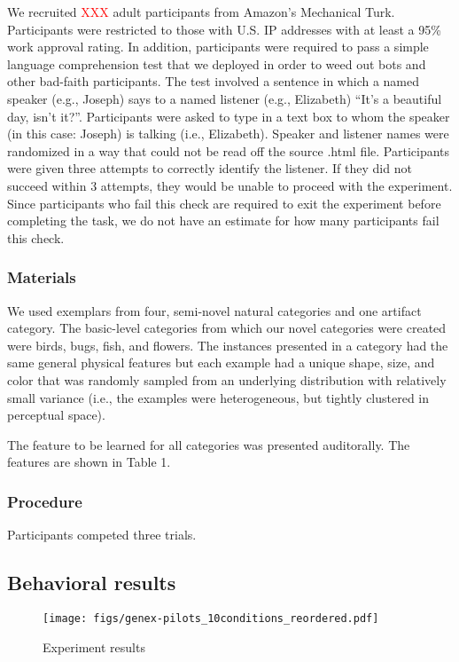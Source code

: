 \documentclass[10pt,letterpaper]{article}
\newcommand{\red}[1]{\textcolor{Red}{#1}}
\begin{document}
We recruited \red{XXX} adult participants from Amazon's Mechanical Turk. 
Participants were restricted to those with U.S. IP addresses with at least a 95\% work approval rating. 
In addition, participants were required to pass a simple language comprehension test that we deployed in order to weed out bots and other bad-faith participants. 
The test involved a sentence in which a named speaker (e.g., Joseph) says to a named listener (e.g., Elizabeth) ``It's a beautiful day, isn't it?''. 
Participants were asked to type in a text box to whom the speaker (in this case: Joseph) is talking (i.e., Elizabeth).
Speaker and listener names were randomized in a way that could not be read off the source .html file.
Participants were given three attempts to correctly identify the listener. 
If they did not succeed within 3 attempts, they would be unable to proceed with the experiment.
Since participants who fail this check are required to exit the experiment before completing the task, we do not have an estimate for how many participants fail this check. 

\subsubsection{Materials}

We used exemplars from four, semi-novel natural categories and one artifact category.
The basic-level categories from which our novel categories were created were birds, bugs, fish, and flowers. 
The instances presented in a category had the same general physical features but each example had a unique shape, size, and color that was randomly sampled from an underlying distribution with relatively small variance (i.e., the examples were heterogeneous, but tightly clustered in perceptual space).

The feature to be learned for all categories was presented auditorally. 
The features are shown in Table 1. 

\subsubsection{Procedure}

Participants competed three trials. 

\subsection{Behavioral results}


\begin{figure}[t]
\begin{center}
\texttt{[image: figs/genex-pilots\_10conditions\_reordered.pdf]}
\end{center}
\caption{Experiment results}
\label{fig:results}
\end{figure}
\end{document}
